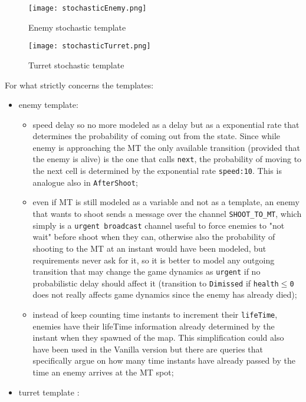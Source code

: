 \documentclass[
10pt, %
a4paper, %
oneside, %
headinclude,footinclude, %
BCOR5mm, %
]{scrartcl}
\begin{document}
	\begin{figure}[h!]
		\centering
		\begin{minipage}{.6\textwidth}
			\centering
			\texttt{[image: stochasticEnemy.png]}
			\caption{Enemy stochastic template}
		\end{minipage}%
		\begin{minipage}{.4\textwidth}
			\centering
			\texttt{[image: stochasticTurret.png]}
			\caption{Turret stochastic template}
		\end{minipage}
	\end{figure}
	
	For what strictly concerns the templates:
	\begin{itemize}
		\item enemy template:
			\begin{itemize}
				\item speed delay so no more modeled as a delay but as a exponential rate that determines the probability of coming out from the state. Since while enemy is approaching the MT the only available transition (provided that the enemy is alive) is the one that calls \texttt{next}, the probability of moving to the next cell is determined by the exponential rate \texttt{speed:10}. This is analogue also in \texttt{AfterShoot};
				\item even if MT is still modeled as a variable and not as a template, an enemy that wants to shoot sends a message over the channel \texttt{SHOOT\_TO\_MT}, which simply is a \texttt{urgent broadcast} channel useful to force enemies to "not wait" before shoot when they can, otherwise also the probability of shooting to the MT at an instant would have been modeled, but requirements never ask for it, so it is better to model any outgoing transition that may change the game dynamics as \texttt{urgent} if no probabilistic delay should affect it (transition to \texttt{Dimissed} if \texttt{health$\leq$0} does not really affects game dynamics since the enemy has already died);
				\item instead of keep counting time instants to increment their \texttt{lifeTime}, enemies have their lifeTime information already determined by the instant when they spawned of the map. This simplification could also have been used in the Vanilla version but there are queries that specifically argue on how many time instants have already passed by the time an enemy arrives at the MT spot;
			\end{itemize}
		\item turret template :

\end{itemize}
\end{document}
